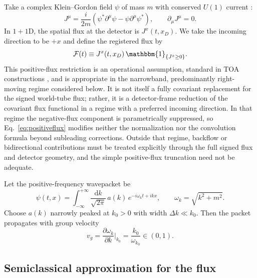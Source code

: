 \documentclass[11pt, a4paper]{article}
\theoremstyle{definition}
\theoremstyle{plain}
\theoremstyle{remark}
\numberwithin{equation}{section}
\newcommand{\dd}{\mathrm{d}}
\newcommand{\F}{\mathcal{F}}
\begin{document}
        Take a complex Klein--Gordon field $\psi$ of mass $m$ with conserved $U(1)$ current \cite{Peskin1995,Weinberg1995}:
        \begin{equation}
            J^\mu = \frac{i}{2m}\left(\psi^\ast \partial^\mu \psi - \psi \partial^\mu \psi^\ast\right),
            \qquad \partial_\mu J^\mu = 0.
            \label{eq:KGcurrent}
        \end{equation}
        In $1+1$D, the spatial flux at the detector is $J^x(t,x_D)$. We take the incoming direction to be $+x$ and define the registered flux by
        \begin{equation}
            \F(t)\equiv J^x(t,x_D)\,\mathbbm{1}_{\{J^x\ge 0\}}.
            \label{eq:positiveflux}
        \end{equation}
        This positive-flux restriction is an operational assumption, standard in TOA constructions \cite{Kijowski1974,Giannitrapani1997,Muga2008}, and is appropriate in the narrowband, predominantly right-moving regime considered below. It is not itself a fully covariant replacement for the signed world-tube flux; rather, it is a detector-frame reduction of the covariant flux functional in a regime with a preferred incoming direction. In that regime the negative-flux component is parametrically suppressed, so Eq.~\eqref{eq:positiveflux} modifies neither the normalization nor the convolution formula beyond subleading corrections. Outside that regime, backflow or bidirectional contributions must be treated explicitly through the full signed flux and detector geometry, and the simple positive-flux truncation need not be adequate.
        
        Let the positive-frequency wavepacket be
        \begin{equation}
            \psi(t,x)=\int_{-\infty}^{+\infty}\frac{\dd k}{\sqrt{2\pi}}\,
            a(k)\,e^{-i\omega_k t + i k x},
            \qquad \omega_k=\sqrt{k^2+m^2}.
            \label{eq:wavepacket}
        \end{equation}
        Choose $a(k)$ narrowly peaked at $k_0>0$ with width $\Delta k\ll k_0$. Then the packet propagates with group velocity
        \begin{equation}
            v_g=\frac{\partial \omega_k}{\partial k}\Big|_{k_0}=\frac{k_0}{\omega_{k_0}}\in(0,1).
        \end{equation}
    
    \subsection{Semiclassical approximation for the flux}
        
\end{document}
